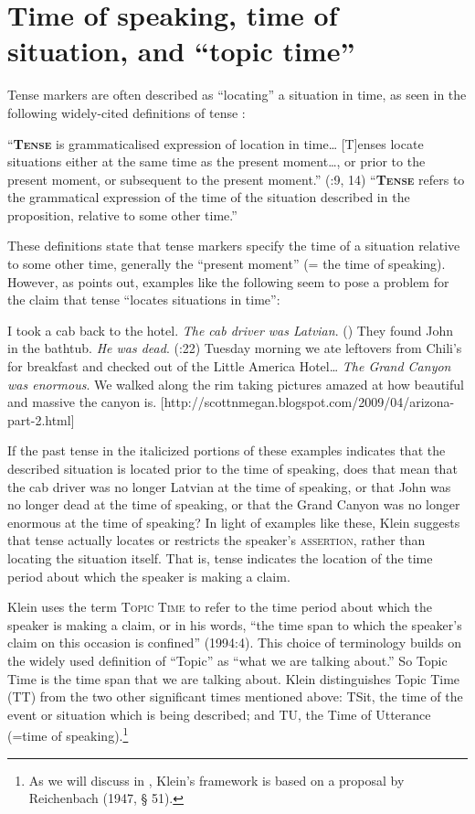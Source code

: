 \section{Time of speaking, time of situation, and “topic time”}\label{sec:} %

Tense markers are often described as “locating” a situation in time, as seen in the following widely-cited definitions of tense :


\ea
\ea  “\textbf{\textsc{Tense}} is grammaticalised expression of location in time… [T]enses locate situations either at the same time as the present moment…, or prior to the present moment, or subsequent to the present moment.” (\citealt{Comrie1985}:9, 14)
\ex  “\textbf{\textsc{Tense}} refers to the grammatical expression of the time of the situation described in the proposition, relative to some other time.” \citep{Bybee1985}
\z \z


These definitions state that tense markers specify the time of a situation relative to some other time, generally the “present moment” (= the time of speaking). However, as \citet{Klein1994} points out, examples like the following seem to pose a problem for the claim that tense “locates situations in time”:


\ea
\ea  I took a cab back to the hotel. \textit{The cab driver was Latvian}. (\citealt{Michaelis2006})
\ex They found John in the bathtub. \textit{He was dead}.  (\citealt{Klein1994}:22)
\ex  Tuesday morning we ate leftovers from Chili’s for breakfast and checked out of the Little America Hotel… \textit{The Grand Canyon was enormous}. We walked along the rim taking pictures amazed at how beautiful and massive the canyon is. [http://scottnmegan.blogspot.com/2009/04/arizona-part-2.html]
\z \z


If the past tense in the italicized portions of these examples indicates that the described situation is located prior to the time of speaking, does that mean that the cab driver was no longer Latvian at the time of speaking, or that John was no longer dead at the time of speaking, or that the Grand Canyon was no longer enormous at the time of speaking? In light of examples like these, Klein suggests that tense actually locates or restricts the speaker’s \textsc{assertion}, rather than locating the situation itself. That is, tense indicates the location of the time period about which the speaker is making a claim.



Klein uses the term \textsc{Topic Time} to refer to the time period about which the speaker is making a claim, or in his words, “the time span to which the speaker’s claim on this occasion is confined” (1994:4). This choice of terminology builds on the widely used definition of “Topic” as “what we are talking about.” So Topic Time is the time span that we are talking about. Klein distinguishes Topic Time (TT) from the two other significant times mentioned above: TSit, the time of the event or situation which is being described; and TU, the Time of Utterance (=time of speaking).\footnote{As we will discuss in , Klein’s framework is based on a proposal by Reichenbach (1947, § 51).}



